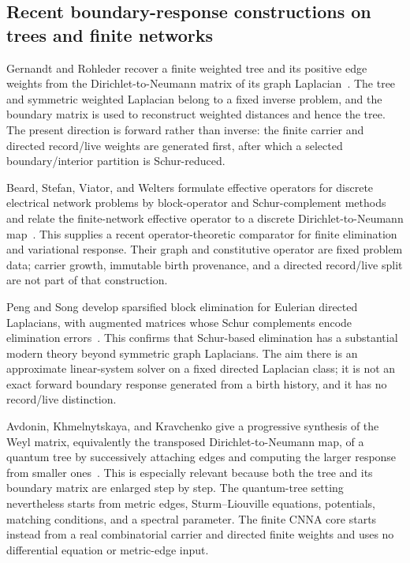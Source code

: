 \documentclass[11pt]{article}
\theoremstyle{remark}
\numberwithin{equation}{section}
\begin{document}
\subsection{Recent boundary-response constructions on trees and finite networks}
Gernandt and Rohleder recover a finite weighted tree and its positive edge weights from the Dirichlet-to-Neumann matrix of its graph Laplacian~\cite{GernandtRohleder2022}. The tree and symmetric weighted Laplacian belong to a fixed inverse problem, and the boundary matrix is used to reconstruct weighted distances and hence the tree. The present direction is forward rather than inverse: the finite carrier and directed record/live weights are generated first, after which a selected boundary/interior partition is Schur-reduced.

Beard, Stefan, Viator, and Welters formulate effective operators for discrete electrical network problems by block-operator and Schur-complement methods and relate the finite-network effective operator to a discrete Dirichlet-to-Neumann map~\cite{BeardStefanViatorWelters2023}. This supplies a recent operator-theoretic comparator for finite elimination and variational response. Their graph and constitutive operator are fixed problem data; carrier growth, immutable birth provenance, and a directed record/live split are not part of that construction.

Peng and Song develop sparsified block elimination for Eulerian directed Laplacians, with augmented matrices whose Schur complements encode elimination errors~\cite{PengSong2022}. This confirms that Schur-based elimination has a substantial modern theory beyond symmetric graph Laplacians. The aim there is an approximate linear-system solver on a fixed directed Laplacian class; it is not an exact forward boundary response generated from a birth history, and it has no record/live distinction.

Avdonin, Khmelnytskaya, and Kravchenko give a progressive synthesis of the Weyl matrix, equivalently the transposed Dirichlet-to-Neumann map, of a quantum tree by successively attaching edges and computing the larger response from smaller ones~\cite{AvdoninKhmelnytskayaKravchenko2023}. This is especially relevant because both the tree and its boundary matrix are enlarged step by step. The quantum-tree setting nevertheless starts from metric edges, Sturm--Liouville equations, potentials, matching conditions, and a spectral parameter. The finite CNNA core starts instead from a real combinatorial carrier and directed finite weights and uses no differential equation or metric-edge input.
\end{document}
